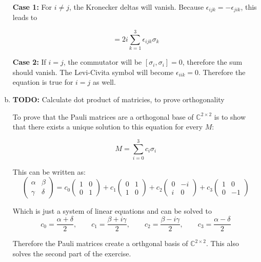 \documentclass[a4paper,german,12pt,smallheadings]{scrartcl}
\begin{document}
\begin{enumerate}[a)]
    \textbf{Case 1:} For $i \neq j$, the Kronecker deltas will vanish.  Because $\epsilon_{ijk}
    = -\epsilon_{jik}$, this leads to

    \begin{equation*}
      [\sigma_i, \sigma_j] = 2i \sum_{k=1}^3 \epsilon_{ijk} \sigma_k
    \end{equation*}

    \textbf{Case 2:} If $i=j$, the commutator will be $[\sigma_i, \sigma_i] =
    0$, therefore the sum should vanish. The Levi-Civita symbol will
    become $\epsilon_{iik} = 0$. Therefore the equation is true for $i = j$ as
    well.
  \item
    \textbf{TODO:} Calculate dot product of matricies, to prove orthogonality

    To prove that the Pauli matrices are a orthogonal base of $\mathbb{C}^{2
    \times 2}$ is to show that there exists a unique solution to this equation
    for every $M$:

    \begin{equation*}
    M = \sum_{i=0}^3 c_i \sigma_i
    \end{equation*}

    This can be written as:
    \begin{equation*}
      \begin{pmatrix}
        \alpha & \beta \\ \gamma & \delta
      \end{pmatrix}
      =
      c_0
      \begin{pmatrix}
        1 & 0 \\
        0 & 1
      \end{pmatrix}
      +
      c_1
      \begin{pmatrix}
        0 & 1 \\
        1 & 0
      \end{pmatrix}
      +
      c_2
      \begin{pmatrix}
        0 & -i \\
        i & 0
      \end{pmatrix}
      +
      c_3
      \begin{pmatrix}
        1 & 0 \\
        0 & -1
      \end{pmatrix}
    \end{equation*}

    Which is just a system of linear equations and can be solved to
    \begin{equation*}
      c_0 = \frac{\alpha + \delta}{2}, \qquad
      c_1 = \frac{\beta + i \gamma}{2}, \qquad
      c_2 = \frac{\beta - i \gamma}{2}, \qquad
      c_3 = \frac{\alpha - \delta}{2}
    \end{equation*}

    Therefore the Pauli matrices create a orthgonal basis of $\mathbb{C}^{2
    \times 2}$. This also solves the second part of the exercise.
\end{enumerate}
\end{document}
